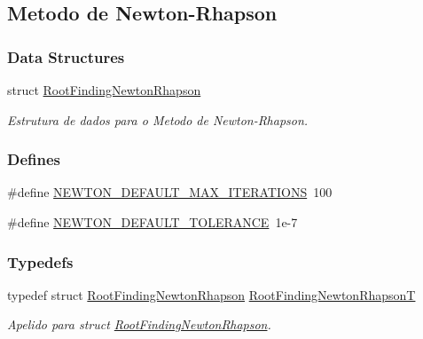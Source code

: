 \hypertarget{group____newton}{
\subsection{Metodo de Newton-Rhapson}
\label{group____newton}
}
\subsubsection*{Data Structures}
\begin{CompactItemize}
\item 
struct \hyperlink{structRootFindingNewtonRhapson}{RootFindingNewtonRhapson}
\begin{CompactList}\small\item\em Estrutura de dados para o Metodo de Newton-Rhapson. \item\end{CompactList}\end{CompactItemize}
\subsubsection*{Defines}
\begin{CompactItemize}
\item 
\#define \hyperlink{group____newton_g4378a473f5c51c7d0e3ad25c0cea3791}{NEWTON\_\-DEFAULT\_\-MAX\_\-ITERATIONS}~100
\item 
\#define \hyperlink{group____newton_gb4bcb10de94d9bd68c583377bd506975}{NEWTON\_\-DEFAULT\_\-TOLERANCE}~1e-7
\end{CompactItemize}
\subsubsection*{Typedefs}
\begin{CompactItemize}
\item 
typedef struct \hyperlink{structRootFindingNewtonRhapson}{RootFindingNewtonRhapson} \hyperlink{group____newton_gf707b2eac68bcf9d277d812da5ac380a}{RootFindingNewtonRhapsonT}
\begin{CompactList}\small\item\em Apelido para struct \hyperlink{structRootFindingNewtonRhapson}{RootFindingNewtonRhapson}. \item\end{CompactList}\end{CompactItemize}
